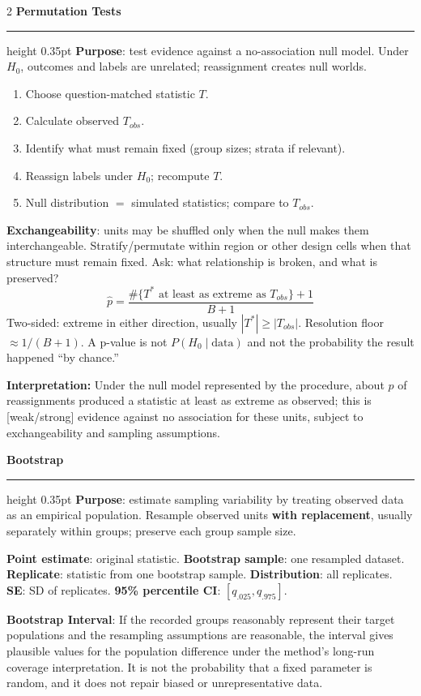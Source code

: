 \documentclass[8pt]{article}
\newcommand{\sect}[1]{\vspace{1pt}\textcolor{accent}{\textbf{\normalsize #1}}\par\vspace{1pt}\hrule height 0.35pt\vspace{0pt}}
\newcommand{\term}[1]{\textbf{#1}}
\begin{document}
\begin{multicols*}{2}
\sect{Permutation Tests}
\term{Purpose}: test evidence against a no-association null model. Under $H_0$, outcomes and labels are unrelated; reassignment creates null worlds.
\begin{enumerate}
\item Choose question-matched statistic $T$.
\item Calculate observed $T_{obs}$.
\item Identify what must remain fixed (group sizes; strata if relevant).
\item Reassign labels under $H_0$; recompute $T$.
\item Null distribution $=$ simulated statistics; compare to $T_{obs}$.
\end{enumerate}
\term{Exchangeability}: units may be shuffled only when the null makes them interchangeable. Stratify/permutate within region or other design cells when that structure must remain fixed. Ask: what relationship is broken, and what is preserved?
\[
\hat p=\frac{\#\{T^*\text{ at least as extreme as }T_{obs}\}+1}{B+1}
\]
Two-sided: extreme in either direction, usually $|T^*|\ge|T_{obs}|$. Resolution floor $\approx1/(B+1)$. A p-value is not $P(H_0\mid\text{data})$ and not the probability the result happened ``by chance.''

\term{Interpretation:} Under the null model represented by the procedure, about $p$ of reassignments produced a statistic at least as extreme as observed; this is [weak/strong] evidence against no association for these units, subject to exchangeability and sampling assumptions.

\sect{Bootstrap}
\term{Purpose}: estimate sampling variability by treating observed data as an empirical population. Resample observed units \term{with replacement}, usually separately within groups; preserve each group sample size.

\term{Point estimate}: original statistic. \term{Bootstrap sample}: one resampled dataset. \term{Replicate}: statistic from one bootstrap sample. \term{Distribution}: all replicates. \term{SE}: SD of replicates. \term{95\% percentile CI}: $[q_{.025},q_{.975}]$.

\term{Bootstrap Interval}: If the recorded groups reasonably represent their target populations and the resampling assumptions are
reasonable, the interval gives plausible values for the population difference under the method’s long-run
coverage interpretation. It is not the probability that a fixed parameter is random, and it does not repair
biased or unrepresentative data.


\end{multicols*}
\end{document}
